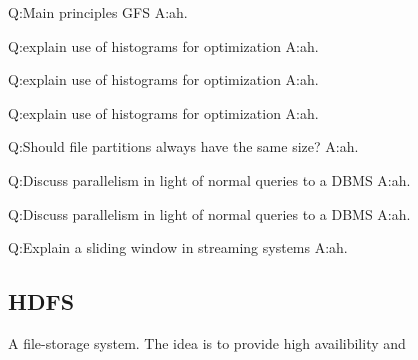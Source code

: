 Q:\@ Main principles GFS
\newline A:\@ ah. 

Q:\@ explain use of histograms for optimization
\newline A:\@ ah.

Q:\@ explain use of histograms for optimization
\newline A:\@ ah.

Q:\@ explain use of histograms for optimization
\newline A:\@ ah.


Q:\@ Should file partitions always have the same size?
\newline A:\@ ah.

Q:\@ Discuss parallelism in light of normal queries to a DBMS
\newline A:\@ ah.

Q:\@ Discuss parallelism in light of normal queries to a DBMS
\newline A:\@ ah.

Q:\@ Explain a sliding window in streaming systems
\newline A:\@ ah.

\subsection{HDFS}
A file-storage system. The idea is to provide high availibility and 
